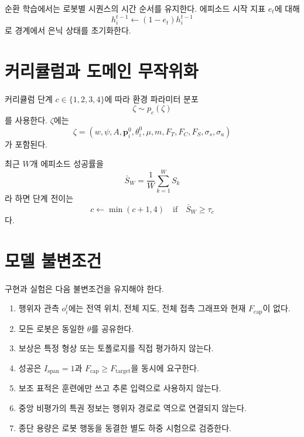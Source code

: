 \documentclass[11pt,a4paper]{article}
\newcommand{\Ftarget}{F_{\mathrm{target}}}
\newcommand{\Fcap}{F_{\mathrm{cap}}}
\newcommand{\Ispan}{I_{\mathrm{span}}}
\begin{document}
순환 학습에서는 로봇별 시퀀스의 시간 순서를 유지한다. 에피소드 시작 지표 \(e_t\)에 대해
\begin{equation}
  h_i^{t-1}\leftarrow(1-e_t)h_i^{t-1}
\end{equation}
로 경계에서 은닉 상태를 초기화한다.

\section{커리큘럼과 도메인 무작위화}

커리큘럼 단계 \(c\in\{1,2,3,4\}\)에 따라 환경 파라미터 분포
\begin{equation}
  \zeta\sim p_c(\zeta)
\end{equation}
를 사용한다. \(\zeta\)에는
\begin{equation}
  \zeta=
  (w,\psi,A,\bm p_i^0,\theta_i^0,
   \mu,m,F_T,F_C,F_S,\sigma_s,\sigma_a)
\end{equation}
가 포함된다.

최근 \(W\)개 에피소드 성공률을
\begin{equation}
  \bar S_W=
  \frac{1}{W}
  \sum_{k=1}^{W}S_k
\end{equation}
라 하면 단계 전이는
\begin{equation}
  c\leftarrow
  \min(c+1,4)
  \quad\text{if}\quad
  \bar S_W\ge\tau_c
  \label{eq:curriculum-transition}
\end{equation}
다.

\section{모델 불변조건}

구현과 실험은 다음 불변조건을 유지해야 한다.

\begin{enumerate}[label=\arabic*.]
  \item 행위자 관측 \(o_i^t\)에는 전역 위치, 전체 지도, 전체 접촉 그래프와 현재 \(\Fcap\)이 없다.
  \item 모든 로봇은 동일한 \(\theta\)를 공유한다.
  \item 보상은 특정 형상 또는 토폴로지를 직접 평가하지 않는다.
  \item 성공은 \(\Ispan=1\)과 \(\Fcap\ge\Ftarget\)을 동시에 요구한다.
  \item 보조 표적은 훈련에만 쓰고 추론 입력으로 사용하지 않는다.
  \item 중앙 비평가의 특권 정보는 행위자 경로로 역으로 연결되지 않는다.
  \item 종단 용량은 로봇 행동을 동결한 별도 하중 시험으로 검증한다.
\end{enumerate}
\end{document}
